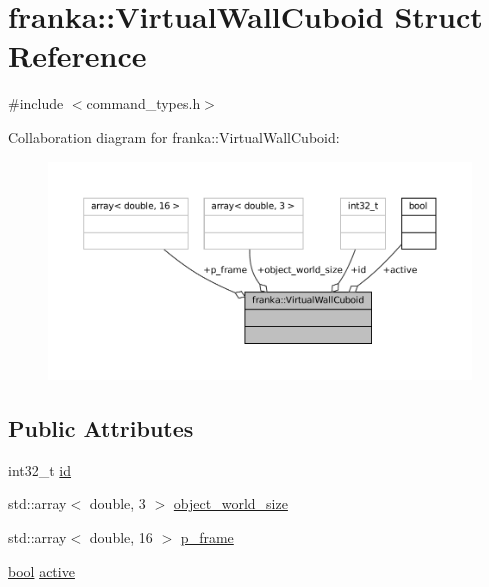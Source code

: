 \hypertarget{structfranka_1_1VirtualWallCuboid}{}\section{franka\+:\+:Virtual\+Wall\+Cuboid Struct Reference}
\label{structfranka_1_1VirtualWallCuboid}


{\ttfamily \#include $<$command\+\_\+types.\+h$>$}



Collaboration diagram for franka\+:\+:Virtual\+Wall\+Cuboid\+:
\nopagebreak
\begin{figure}[H]
\begin{center}
\leavevmode
\includegraphics[width=350pt]{structfranka_1_1VirtualWallCuboid__coll__graph}
\end{center}
\end{figure}
\subsection*{Public Attributes}
\begin{DoxyCompactItemize}
\item 
int32\+\_\+t \hyperlink{structfranka_1_1VirtualWallCuboid_a2cee9b57fa420372a9576899875ad71a}{id}
\item 
std\+::array$<$ double, 3 $>$ \hyperlink{structfranka_1_1VirtualWallCuboid_a754b771744e0df1facecd31835a78790}{object\+\_\+world\+\_\+size}
\item 
std\+::array$<$ double, 16 $>$ \hyperlink{structfranka_1_1VirtualWallCuboid_ab34ba4f99676a36a4e1171fd8b431391}{p\+\_\+frame}
\item 
\hyperlink{classbool}{bool} \hyperlink{structfranka_1_1VirtualWallCuboid_a69a20329da226fe49702b7d725670042}{active}
\end{DoxyCompactItemize}


